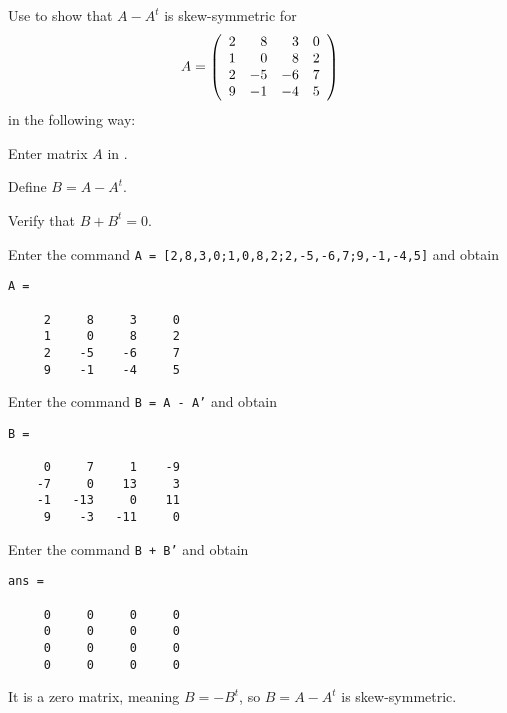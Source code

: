 \documentclass{ximera}
\begin{document}
\begin{computerExercise}  \label{YZ_1.3_skewsym3}
Use \Matlab to show that $A-A^t$ is skew-symmetric for 
\[
A=\left(\begin{array}{rrrrrrrrrrrrrrrrrr} 2&8&3&0\\1&0&8&2\\2&-5&-6&7\\9&-1&-4&5 \end{array}\right)
\]
in the following way: 
\begin{enumeratea}
\item Enter matrix $A$ in \Matlab.
\item Define $B=A-A^t$.
\item Verify that $B+B^t=0$.
\end{enumeratea}

\begin{solution}
\soln
\begin{enumeratea}

\item Enter the command {\tt A = [2,8,3,0;1,0,8,2;2,-5,-6,7;9,-1,-4,5]} and obtain
\begin{verbatim}
A =

     2     8     3     0
     1     0     8     2
     2    -5    -6     7
     9    -1    -4     5
\end{verbatim}
\item Enter the command {\tt B = A - A'} and obtain
\begin{verbatim}
B =

     0     7     1    -9
    -7     0    13     3
    -1   -13     0    11
     9    -3   -11     0
\end{verbatim}
\item Enter the command {\tt B + B'} and obtain
\begin{verbatim}
ans =

     0     0     0     0
     0     0     0     0
     0     0     0     0
     0     0     0     0

\end{verbatim}
It is a zero matrix, meaning $B=-B^t$, so $B=A-A^t$ is skew-symmetric.
\end{enumeratea}
\end{solution}
\end{computerExercise}
\end{document}
